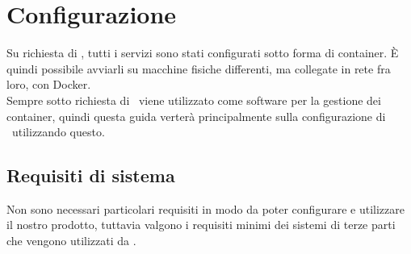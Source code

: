 \section{Configurazione}\label{configurazione}

Su richiesta di \II, tutti i servizi sono stati configurati sotto forma di container. È quindi possibile avviarli su macchine fisiche differenti, ma collegate in rete fra loro, con Docker.\\
Sempre sotto richiesta di \II\ viene utilizzato  come software per la gestione dei container, quindi questa guida verterà principalmente sulla configurazione di \progetto\ utilizzando questo.

\subsection{Requisiti di sistema}

	Non sono necessari particolari requisiti in modo da poter configurare e utilizzare il nostro prodotto, tuttavia valgono i requisiti minimi dei sistemi di terze parti che vengono utilizzati da \progetto.

